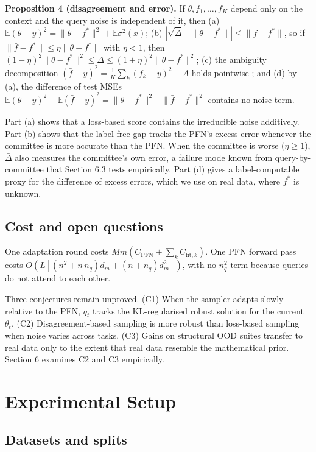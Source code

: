 \documentclass[mathematics,article,submit,pdftex,moreauthors]{Definitions/mdpi}
\begin{document}
\textbf{Proposition 4 (disagreement and error).} If $\theta,f_1,\dots,f_K$ depend only on the context and the query noise is independent of it, then (a) $\mathbb{E}(\theta-y)^2=\|\theta-f^{*}\|^2+\mathbb{E}\sigma^2(x)$; (b) $|\sqrt{\bar\Delta}-\|\theta-f^{*}\||\le\|\bar f-f^{*}\|$, so if $\|\bar f-f^{*}\|\le\eta\|\theta-f^{*}\|$ with $\eta<1$, then $(1-\eta)^2\|\theta-f^{*}\|^2\le\bar\Delta\le(1+\eta)^2\|\theta-f^{*}\|^2$; (c) the ambiguity decomposition $(\bar f-y)^2=\frac1K\sum_k(f_k-y)^2-A$ holds pointwise \cite{krogh1995neural}; and (d) by (a), the difference of test MSEs $\mathbb{E}(\theta-y)^2-\mathbb{E}(\bar f-y)^2=\|\theta-f^{*}\|^2-\|\bar f-f^{*}\|^2$ contains no noise term.

Part (a) shows that a loss-based score contains the irreducible noise additively. Part (b) shows that the label-free gap tracks the PFN's excess error whenever the committee is more accurate than the PFN. When the committee is worse ($\eta\ge1$), $\bar\Delta$ also measures the committee's own error, a failure mode known from query-by-committee \cite{burbidge2007active} that Section 6.3 tests empirically. Part (d) gives a label-computable proxy for the difference of excess errors, which we use on real data, where $f^{*}$ is unknown.

\subsection{Cost and open questions}

One adaptation round costs $M m(C_{\mathrm{PFN}}+\sum_k C_{\mathrm{fit},k})$. One PFN forward pass costs $O(L[(n^2+n\,n_q)d_m+(n+n_q)d_m^2])$, with no $n_q^2$ term because queries do not attend to each other.

Three conjectures remain unproved. (C1) When the sampler adapts slowly relative to the PFN, $q_t$ tracks the KL-regularised robust solution for the current $\theta_t$. (C2) Disagreement-based sampling is more robust than loss-based sampling when noise varies across tasks. (C3) Gains on structural OOD suites transfer to real data only to the extent that real data resemble the mathematical prior. Section 6 examines C2 and C3 empirically.

\section{Experimental Setup}

\subsection{Datasets and splits}
\end{document}
